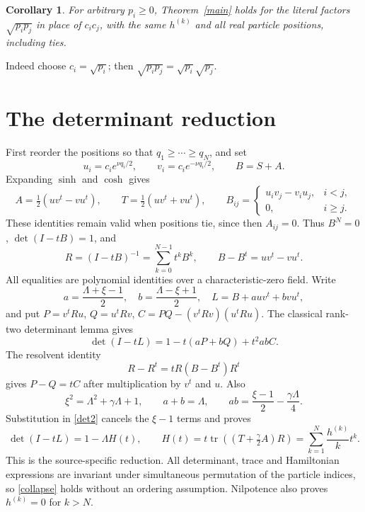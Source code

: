 \documentclass[11pt]{article}
\newtheorem{corollary}{Corollary}
\begin{document}
\begin{corollary}\label{positive}
For arbitrary $p_i\geq0$, Theorem~\ref{main} holds for the literal factors $\sqrt{p_ip_j}$ in place of $c_ic_j$, with the same $h^{(k)}$ and all real particle positions, including ties.
\end{corollary}
Indeed choose $c_i=\sqrt{p_i}$; then $\sqrt{p_ip_j}=\sqrt{p_i}\sqrt{p_j}$. 

\section*{The determinant reduction}
First reorder the positions so that $q_1\geq\cdots\geq q_N$, and set
\[
 u_i=c_i e^{\nu q_i/2},\qquad v_i=c_i e^{-\nu q_i/2},\qquad B=S+A.
\]
Expanding $\sinh$ and $\cosh$ gives
\[
 A=\tfrac12(uv^t-vu^t),\qquad T=\tfrac12(uv^t+vu^t),\qquad
 B_{ij}=\begin{cases}u_iv_j-v_iu_j,&i<j,\\0,&i\geq j.\end{cases}
\]
These identities remain valid when positions tie, since then $A_{ij}=0$. Thus $B^N=0$, $\det(I-tB)=1$, and
\[
 R=(I-tB)^{-1}=\sum_{k=0}^{N-1}t^kB^k,\qquad B-B^t=uv^t-vu^t.
\]
All equalities are polynomial identities over a characteristic-zero field. Write
\[
 a=\frac{\Lambda+\xi-1}{2},\quad b=\frac{\Lambda-\xi+1}{2},\quad
 L=B+a uv^t+bvu^t,
\]
and put $P=v^tRu$, $Q=u^tRv$, $C=PQ-(v^tRv)(u^tRu)$. The classical rank-two determinant lemma gives
\begin{equation}\label{det2}
 \det(I-tL)=1-t(aP+bQ)+t^2abC.
\end{equation}
The resolvent identity
\[
 R-R^t=tR(B-B^t)R^t
\]
gives $P-Q=tC$ after multiplication by $v^t$ and $u$. Also
\[
 \xi^2=\Lambda^2+\gamma\Lambda+1,\qquad a+b=\Lambda,\qquad
 ab=\frac{\xi-1}{2}-\frac{\gamma\Lambda}{4}.
\]
Substitution in \eqref{det2} cancels the $\xi-1$ terms and proves
\begin{equation}\label{collapse}
 \det(I-tL)=1-\Lambda H(t),\qquad
 H(t)=t\operatorname{tr}\left((T+\tfrac\gamma2 A)R\right)
      =\sum_{k=1}^N\frac{h^{(k)}}k t^k.
\end{equation}
This is the source-specific reduction. All determinant, trace and Hamiltonian expressions are invariant under simultaneous permutation of the particle indices, so \eqref{collapse} holds without an ordering assumption. Nilpotence also proves $h^{(k)}=0$ for $k>N$.
\end{document}
